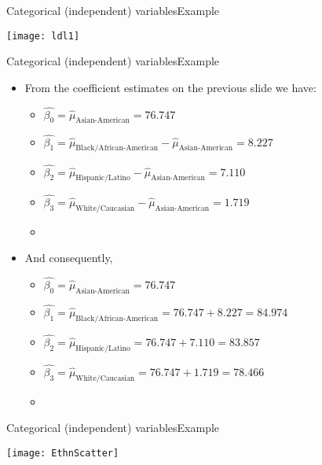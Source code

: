 \documentclass[xcolor=dvipsnames]{beamer}
\begin{document}
\begin{frame}{Categorical (independent) variables}{Example}
	\begin{center}
		\texttt{[image: ldl1]}
	\end{center}
\end{frame}

\begin{frame}{Categorical (independent) variables}{Example}
	\begin{itemize}
		\item From the coefficient estimates on the previous slide we have: \pause
			\begin{itemize}
			\item $\hat{\beta_0} = \hat{\mu}_{\text{Asian-American}} = 76.747$ \pause
			\item $\hat{\beta_1} = \hat{\mu}_{\text{Black/African-American}} -\hat{\mu}_{\text{Asian-American}} = 8.227$ \pause
			\item $\hat{\beta_2} = \hat{\mu}_{\text{Hispanic/Latino}}- \hat{\mu}_{\text{Asian-American}} = 7.110$ \pause
			\item $\hat{\beta_3} = \hat{\mu}_{\text{White/Caucasian}} - \hat{\mu}_{\text{Asian-American}}= 1.719$ \pause
			\item[]
		\end{itemize}
		\item And consequently, \pause
		\begin{itemize}
			\item $\hat{\beta_0} = \hat{\mu}_{\text{Asian-American}} = 76.747$ \pause
			\item $\hat{\beta_1} = \hat{\mu}_{\text{Black/African-American}} =  76.747 + 8.227= 84.974$ \pause
			\item $\hat{\beta_2} = \hat{\mu}_{\text{Hispanic/Latino}} =  76.747 + 7.110 = 83.857$ \pause
			\item $\hat{\beta_3} = \hat{\mu}_{\text{White/Caucasian}} =   76.747 + 1.719 = 78.466$
			\item[]
		\end{itemize}
	\end{itemize}
\end{frame}

\begin{frame}{Categorical (independent) variables}{Example}
	\begin{center}
		\texttt{[image: EthnScatter]}
	\end{center}
\end{frame}
\end{document}
